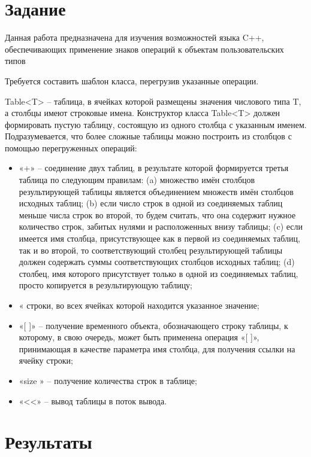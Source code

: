 \documentclass[a4paper, 14pt]{extarticle}
\begin{document}
\renewcommand{\ttdefault}{pcr}

\setlength{\tabcolsep}{3pt}
\newpage
\setcounter{page}{2}

\section{Задание}\label{Sect::task}
Данная работа предназначена для изучения возможностей языка C++,
обеспечивающих применение знаков операций к объектам пользовательских типов

Требуется составить шаблон класса,
перегрузив указанные операции. 

Table<T> – таблица, в ячейках которой
размещены значения числового типа T, а
столбцы имеют строковые имена.
Конструктор класса Table<T> должен
формировать пустую таблицу, состоящую из
одного столбца с указанным именем.
Подразумевается, что более сложные таблицы
можно построить из столбцов с помощью
перегруженных операций:
\begin{itemize}
\item «+» – соединение двух таблиц, в
результате которой формируется третья
таблица по следующим правилам:
(a) множество имён столбцов
результирующей таблицы является
объединением множеств имён столбцов
исходных таблиц;
(b) если число строк в одной из
соединяемых таблиц меньше числа строк
во второй, то будем считать, что она
содержит нужное количество строк,
забитых нулями и расположенных внизу
таблицы;
(c) если имеется имя столбца,
присутствующее как в первой из
соединяемых таблиц, так и во второй, то
соответствующий столбец
результирующей таблицы должен
содержать суммы соответствующих
столбцов исходных таблиц;
(d) столбец, имя которого присутствует
только в одной из соединяемых таблиц,
просто копируется в результирующую
таблицу;
\item «%
строки, во всех ячейках которой
находится указанное значение;
\item «[ ]» – получение временного объекта,
обозначающего строку таблицы, к
которому, в свою очередь, может быть
применена операция «[ ]», принимающая
в качестве параметра имя столбца, для
получения ссылки на ячейку строки;
\item «size » – получение количества строк в
таблице;
\item «<<» – вывод таблицы в поток вывода.
\end{itemize}

\section{Результаты}\label{Sect::res}
\end{document}
